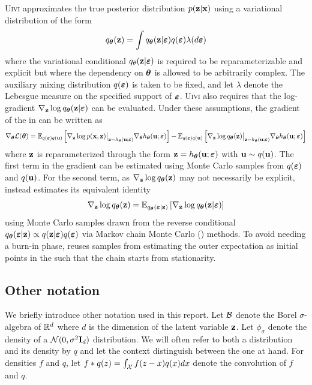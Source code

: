 \documentclass[10pt]{article}
\begin{document}
\textsc{Uivi} approximates the true posterior distribution $p(\mathbf{z}|\mathbf{x})$ using a variational distribution of the form
\[
q_{\bm{\theta}}(\mathbf{z}) = \int q_{\bm{\theta}}(\mathbf{z}|\bm{\varepsilon})q(\bm{\varepsilon})\lambda(d\bm{\varepsilon})
\]
where the variational conditional $q_\theta(\mathbf{z}|\bm{\varepsilon})$ is required to be reparameterizable and explicit but where the dependency on ${\bm{\theta}}$ is allowed to be arbitrarily complex. The auxiliary mixing distribution $q(\bm{\varepsilon})$ is taken to be fixed, and let $\lambda$ denote the Lebesgue measure on the specified support of $\bm{\varepsilon}$. \textsc{Uivi} also requires that the log-gradient $\nabla_{\mathbf{z}}\log q_{\bm{\theta}}(\mathbf{z}|\bm{\varepsilon})$ can be evaluated. Under these assumptions, the gradient of the \elbo in \uivi can be written as
\[
\nabla_{\bm{\theta}} \mathcal{L}({\bm{\theta}}) = \mathbb{E}_{q(\bm{\varepsilon})q(\mathbf{u})}\left[\nabla_{\mathbf{z}} \log p(\mathbf{x},\mathbf{z})\big|_{\mathbf{z}=h_{\bm{\theta}}(\mathbf{u};\bm{\varepsilon})}\nabla_{\bm{\theta}} h_{\bm{\theta}}(\mathbf{u};\bm{\varepsilon})\right] - \mathbb{E}_{q(\bm{\varepsilon})q(\mathbf{u})}\left[\nabla_{\mathbf{z}} \log q_{\bm{\theta}}(\mathbf{z})\big|_{\mathbf{z}=h_{\bm{\theta}}(\mathbf{u};\bm{\varepsilon})}\nabla_{\bm{\theta}} h_{\bm{\theta}}(\mathbf{u};\bm{\varepsilon})\right]
\]
where $\mathbf{z}$ is reparameterized through the form $\mathbf{z} = h_{\bm{\theta}}(\mathbf{u};\bm{\varepsilon})$ with $\mathbf{u}\sim q(\mathbf{u})$. The first term in the gradient can be estimated using Monte Carlo samples from $q(\bm{\varepsilon})$ and $q(\mathbf{u})$. For the second term, as $\nabla_{\mathbf{z}} \log q_{\bm{\theta}}(\mathbf{z})$ may not necessarily be explicit, \uivi instead estimates its equivalent identity
\[
\nabla_{\mathbf{z}} \log q_{\bm{\theta}}(\mathbf{z}) = \mathbb{E}_{q_{\bm{\theta}}(\bm{\varepsilon}|\mathbf{z})}\left[\nabla_{\mathbf{z}}\log q_{\bm{\theta}}(\mathbf{z}|\bm{\varepsilon})\right]
\]
using Monte Carlo samples drawn from the reverse conditional $q_{\bm{\theta}}(\bm{\varepsilon}|\mathbf{z})\propto q(\mathbf{z}|\bm{\varepsilon})q(\bm{\varepsilon})$ via Markov chain Monte Carlo (\mcmc) methods. To avoid needing a burn-in phase, \uivi reuses samples from estimating the outer expectation as initial points in the \mcmc such that the chain starts from stationarity.


\subsection{Other notation} \label{sec:notation}

We briefly introduce other notation used in this report. Let $\mathcal{B}$ denote the Borel $\sigma$-algebra of $\mathbb{R}^d$ where $d$ is the dimension of the latent variable $\mathbf{z}$. Let $\phi_\sigma$ denote the density of a $\mathcal{N}(0,\sigma^2\mathbf{I}_d)$ distribution. We will often refer to both a distribution and its density by $q$ and let the context distinguish between the one at hand. For densities $f$ and $q$, let $f*q(z)=\int_{\mathcal{X}} f(z-x)q(x)dx$ denote the convolution of $f$ and $q$.
\end{document}
